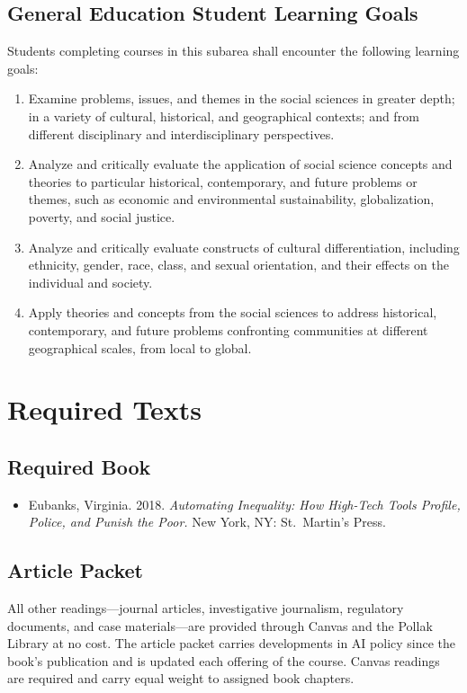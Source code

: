 \documentclass[12pt]{article}
\begin{document}
\subsection*{General Education Student Learning Goals}
Students completing courses in this subarea shall encounter the following learning goals:
\begin{enumerate}
    \item Examine problems, issues, and themes in the social sciences in greater depth; in a variety of cultural, historical, and geographical contexts; and from different disciplinary and interdisciplinary perspectives.
    \item Analyze and critically evaluate the application of social science concepts and theories to particular historical, contemporary, and future problems or themes, such as economic and environmental sustainability, globalization, poverty, and social justice.
    \item Analyze and critically evaluate constructs of cultural differentiation, including ethnicity, gender, race, class, and sexual orientation, and their effects on the individual and society.
    \item Apply theories and concepts from the social sciences to address historical, contemporary, and future problems confronting communities at different geographical scales, from local to global.
\end{enumerate}

\section*{Required Texts}

\subsection*{Required Book}

\begin{itemize}
    \item Eubanks, Virginia. 2018. \emph{Automating Inequality: How High-Tech Tools Profile, Police, and Punish the Poor.} New York, NY: St.\ Martin's Press.
\end{itemize}

\subsection*{Article Packet}

All other readings---journal articles, investigative journalism, regulatory documents, and case materials---are provided through Canvas and the Pollak Library at no cost. The article packet carries developments in AI policy since the book's publication and is updated each offering of the course. Canvas readings are required and carry equal weight to assigned book chapters.
\end{document}
